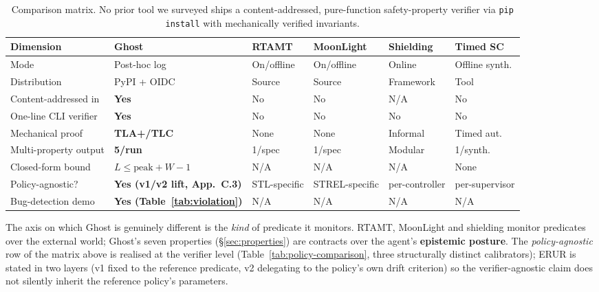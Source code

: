 \documentclass[11pt,a4paper]{article}
\begin{document}
\begin{table}[h]
\centering
\small
\setlength{\tabcolsep}{4pt}
\begin{tabularx}{\linewidth}{l X X X X X}
\toprule
\textbf{Dimension} & \textbf{Ghost} & RTAMT & MoonLight & Shielding & Timed SC \\
\midrule
Mode                  & Post-hoc log         & On/offline    & On/offline & Online & Offline synth.\\
Distribution          & PyPI + OIDC          & Source        & Source     & Framework & Tool \\
Content-addressed in  & \textbf{Yes}         & No            & No         & N/A      & No \\
One-line CLI verifier & \textbf{Yes}         & No            & No         & No       & No \\
Mechanical proof      & \textbf{TLA+/TLC}    & None          & None       & Informal & Timed aut. \\
Multi-property output & \textbf{5/run}       & 1/spec        & 1/spec     & Modular  & 1/synth. \\
Closed-form bound     & $L\le \mathrm{peak}{+}W{-}1$ & N/A     & N/A        & N/A      & None \\
Policy-agnostic?      & \textbf{Yes (v1/v2 lift, App.~C.3)} & STL-specific & STREL-specific & per-controller & per-supervisor \\
Bug-detection demo    & \textbf{Yes (Table~\ref{tab:violation})} & N/A & N/A & N/A      & N/A \\
\bottomrule
\end{tabularx}
\caption{Comparison matrix. No prior tool we surveyed ships a
content-addressed, pure-function safety-property verifier via
\texttt{pip install} with mechanically verified invariants.}
\label{tab:comparison}
\end{table}

The axis on which Ghost is genuinely different is the \emph{kind}
of predicate it monitors. RTAMT, MoonLight and shielding monitor
predicates over the external world; Ghost's seven properties
(\S\ref{sec:properties}) are contracts over the agent's
\textbf{epistemic posture}. The \emph{policy-agnostic} row of the
matrix above is realised at the verifier level
(Table~\ref{tab:policy-comparison}, three structurally distinct
calibrators); ERUR is stated in two layers (v1 fixed to the
reference predicate, v2 delegating to the policy's own drift
criterion) so the verifier-agnostic claim does not silently
inherit the reference policy's parameters.
\end{document}
